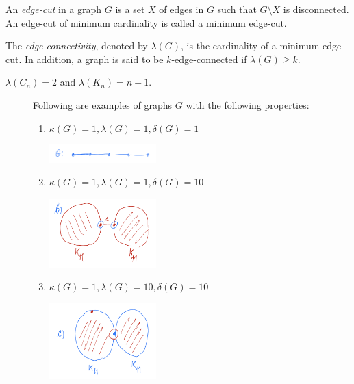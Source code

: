 \begin{definition}
  An \textit{edge-cut} in a graph \(G\) is a set \(X\) of edges
  in \(G\) such that \(G \setminus X\) is disconnected. An
  edge-cut of minimum cardinality is called a minimum edge-cut.
\end{definition}

\begin{definition}
  The \textit{edge-connectivity}, denoted by \(\lambda(G)\), is
  the cardinality of a minimum edge-cut. In addition, a graph is
  said to be \(k\)-edge-connected if \(\lambda(G) \geq k\).
\end{definition}

\begin{nexample}
  \(\lambda(C_n) = 2\) and \(\lambda(K_n) = n-1\).
\end{nexample}

\begin{figure}[ht]
\begin{nexample}
  Following are examples of graphs \(G\) with the following
  properties:
  \begin{enumerate}
    \item \(\kappa(G) = 1, \lambda(G) = 1, \delta(G) = 1\)
      \begin{center}
        \includegraphics[width=0.39\textwidth]{figures/l10/props1}
      \end{center}

    \item \(\kappa(G) = 1, \lambda(G) = 1, \delta(G) = 10\)
      \begin{center}
        \includegraphics[width=0.39\textwidth]{figures/l10/props2}
      \end{center}

    \item \(\kappa(G) = 1, \lambda(G) = 10, \delta(G) = 10\)
      \begin{center}
        \includegraphics[width=0.39\textwidth]{figures/l10/props3}
      \end{center}
  \end{enumerate}
\end{nexample}
\end{figure}

